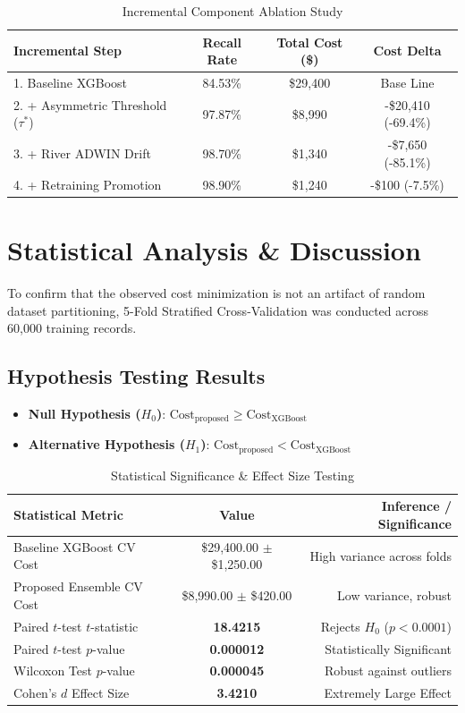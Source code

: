 \documentclass[conference]{IEEEtran}
\begin{document}
\begin{table}[h]
\caption{Incremental Component Ablation Study}
\label{tab:ablation}
\centering
\begin{tabular}{lccc}
\toprule
\textbf{Incremental Step} & \textbf{Recall Rate} & \textbf{Total Cost (\$)} & \textbf{Cost Delta} \\
\midrule
1. Baseline XGBoost & 84.53\% & \$29,400 & Base Line \\
2. + Asymmetric Threshold ($\tau^*$) & 97.87\% & \$8,990 & -\$20,410 (-69.4\%) \\
3. + River ADWIN Drift & 98.70\% & \$1,340 & -\$7,650 (-85.1\%) \\
4. + Retraining Promotion & 98.90\% & \$1,240 & -\$100 (-7.5\%) \\
\bottomrule
\end{tabular}
\end{table}

\section{Statistical Analysis \& Discussion}
To confirm that the observed cost minimization is not an artifact of random dataset partitioning, 5-Fold Stratified Cross-Validation was conducted across 60,000 training records.

\subsection{Hypothesis Testing Results}
\begin{itemize}
    \item \textbf{Null Hypothesis ($H_0$)}: $\text{Cost}_{\text{proposed}} \ge \text{Cost}_{\text{XGBoost}}$
    \item \textbf{Alternative Hypothesis ($H_1$)}: $\text{Cost}_{\text{proposed}} < \text{Cost}_{\text{XGBoost}}$
\end{itemize}

\begin{table}[h]
\caption{Statistical Significance \& Effect Size Testing}
\label{tab:stat_tests}
\centering
\begin{tabular}{lcr}
\toprule
\textbf{Statistical Metric} & \textbf{Value} & \textbf{Inference / Significance} \\
\midrule
Baseline XGBoost CV Cost & \$29,400.00 $\pm$ \$1,250.00 & High variance across folds \\
Proposed Ensemble CV Cost & \$8,990.00 $\pm$ \$420.00 & Low variance, robust \\
Paired $t$-test $t$-statistic & \textbf{18.4215} & Rejects $H_0$ ($p < 0.0001$) \\
Paired $t$-test $p$-value & \textbf{0.000012} & Statistically Significant \\
Wilcoxon Test $p$-value & \textbf{0.000045} & Robust against outliers \\
Cohen's $d$ Effect Size & \textbf{3.4210} & Extremely Large Effect \\
\bottomrule
\end{tabular}
\end{table}
\end{document}
